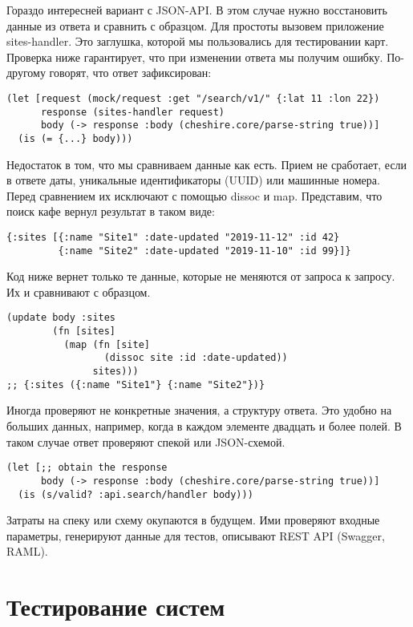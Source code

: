 Гораздо интересней вариант с JSON-API. В этом случае нужно восстановить данные
из ответа и сравнить с образцом. Для простоты вызовем приложение
sites-handler. Это заглушка, которой мы пользовались для тестировании
карт. Проверка ниже гарантирует, что при изменении ответа мы получим
ошибку. По-другому говорят, что ответ зафиксирован:

\begin{verbatim}
(let [request (mock/request :get "/search/v1/" {:lat 11 :lon 22})
      response (sites-handler request)
      body (-> response :body (cheshire.core/parse-string true))]
  (is (= {...} body)))
\end{verbatim}

Недостаток в том, что мы сравниваем данные как есть. Прием не сработает, если в
ответе даты, уникальные идентификаторы (UUID) или машинные номера. Перед
сравнением их исключают с помощью dissoc и map. Представим, что поиск кафе
вернул результат в таком виде:

\begin{verbatim}
{:sites [{:name "Site1" :date-updated "2019-11-12" :id 42}
         {:name "Site2" :date-updated "2019-11-10" :id 99}]}
\end{verbatim}

Код ниже вернет только те данные, которые не меняются от запроса к запросу. Их и
сравнивают с образцом.

\begin{verbatim}
(update body :sites
        (fn [sites]
          (map (fn [site]
                 (dissoc site :id :date-updated))
               sites)))
;; {:sites ({:name "Site1"} {:name "Site2"})}
\end{verbatim}

Иногда проверяют не конкретные значения, а структуру ответа. Это удобно на
больших данных, например, когда в каждом элементе двадцать и более полей. В
таком случае ответ проверяют спекой или JSON-схемой.

\begin{verbatim}
(let [;; obtain the response
      body (-> response :body (cheshire.core/parse-string true))]
  (is (s/valid? :api.search/handler body)))
\end{verbatim}

Затраты на спеку или схему окупаются в будущем. Ими проверяют входные параметры,
генерируют данные для тестов, описывают REST API (Swagger, RAML).

\section{Тестирование систем}

